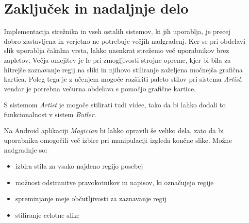 \documentclass[runningheads,a4paper]{llncs}
\begin{document}
\section{Zaključek in nadaljnje delo}
Implementacija strežnika in vseh ostalih sistemov, ki jih uporablja, je precej dobro zastavljena in verjetno ne potrebuje večjih nadgradenj. Ker se pri obdelavi slik uporablja čakalna vrsta, lahko naenkrat strežemo več uporabnikov brez zapletov. Večja omejitev je le pri zmogljivosti strojne opreme, kjer bi bila za hitrejše zaznavanje regij na sliki in njihovo stiliranje zaželjena močnejša grafična kartica. Poleg tega je z učenjem mogoče razširiti paleto stilov pri sistemu \textit{Artist}, vendar je potrebna večurna obdelava s pomočjo grafične kartice. 

S sistemom \textit{Artist} je mogoče stilirati tudi videe, tako da bi lahko dodali to funkcionalnost v sistem \textit{Butler}.

Na Android aplikaciji \textit{Magician} bi lahko opravili še veliko dela, zato da bi uporabniku omogočili več izbire pri manipulaciji izgleda končne slike. Možne nadgradnje so: 
\begin{itemize}
\item izbira stila za vsako najdeno regijo posebej
\item možnost odstranitve pravokotnikov in napisov, ki označujejo regije
\item spreminjanje meje občutljivosti za zaznavanje regij
\item stiliranje celotne slike
\end{itemize}



\end{document}
